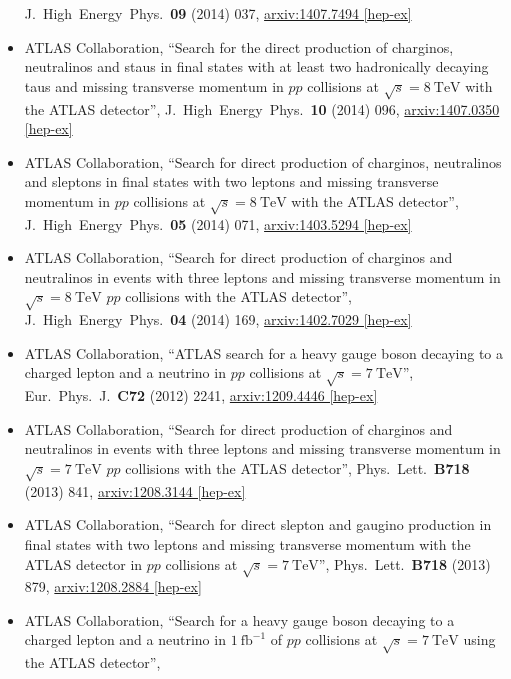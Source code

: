 \documentclass[a4paper,10pt]{article}
\begin{document}
\begin{itemize}
	J.\ High\ Energy\ Phys.\ {\bf 09} (2014) 037,
	\href{http://arxiv.org/abs/1407.7494}{arxiv:1407.7494 [hep-ex]}
	\item ATLAS Collaboration, 
	``Search for the direct production of charginos, neutralinos and staus in final states with at least two hadronically decaying taus and missing transverse momentum in $pp$ collisions at $\sqrt{s} = 8\ \mathrm{TeV}$ with the ATLAS detector'',
	J.\ High\ Energy\ Phys.\ {\bf 10} (2014) 096,
	\href{http://arxiv.org/abs/1407.0350}{arxiv:1407.0350 [hep-ex]}
	\item ATLAS Collaboration, 
	``Search for direct production of charginos, neutralinos and sleptons in final states with two leptons and missing transverse momentum in $pp$ collisions at 
	$\sqrt{s} = 8\ \mathrm{TeV}$ with the ATLAS detector'', 
	J.\ High\ Energy\ Phys.\ {\bf 05} (2014) 071, 
	\href{http://arxiv.org/abs/1403.5294}{arxiv:1403.5294 [hep-ex]}
	\item ATLAS Collaboration, 
	``Search for direct production of charginos and neutralinos in events with three leptons and missing transverse momentum in $\sqrt{s} = 8\ \mathrm{TeV}$ $pp$ collisions with the ATLAS detector'',
	J.\ High\ Energy\ Phys.\ {\bf 04} (2014) 169,
	\href{http://arxiv.org/abs/1402.7029}{arxiv:1402.7029 [hep-ex]}
	\item ATLAS Collaboration,
	``ATLAS search for a heavy gauge boson decaying to a charged lepton and a neutrino in $pp$ collisions at $\sqrt{s} = 7\ \mathrm{TeV}$'',
	Eur.\ Phys.\ J.\ {\bf C72} (2012) 2241,
	\href{http://arxiv.org/abs/1209.4446}{arxiv:1209.4446 [hep-ex]}
	\item ATLAS Collaboration,
	``Search for direct production of charginos and neutralinos in events with three leptons and missing transverse momentum in $\sqrt{s} = 7\ \mathrm{TeV}$ $pp$ collisions with the ATLAS detector'', 
	Phys.\ Lett.\ {\bf B718} (2013) 841, 
	\href{http://arxiv.org/abs/1208.3144}{arxiv:1208.3144 [hep-ex]}
	\item ATLAS Collaboration,
	``Search for direct slepton and gaugino production in final states with two leptons and missing transverse momentum with the ATLAS detector in $pp$ collisions at $\sqrt{s} = 7\ \mathrm{TeV}$'', 
	Phys.\ Lett.\ {\bf B718} (2013) 879, \href{http://arxiv.org/abs/1208.2884}{arxiv:1208.2884 [hep-ex]}
	\item ATLAS Collaboration,
	``Search for a heavy gauge boson decaying to a charged lepton and a neutrino in $1\ \mathrm{fb}^{-1}$ of $pp$ collisions at $\sqrt{s} = 7\ \mathrm{TeV}$ using the ATLAS detector'', 

\end{itemize}
\end{document}
